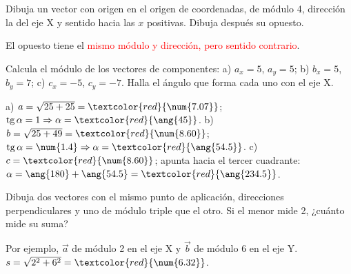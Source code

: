 \begin{exercise}
    Dibuja un vector con origen en el origen de coordenadas, de módulo 4, dirección la del eje X y sentido hacia las \(x\) positivas. Dibuja después su opuesto.
    \begin{solu}
        \begin{center}
        \end{center}
        El opuesto tiene el \textcolor{red}{mismo módulo y dirección, pero sentido contrario}.
    \end{solu}
\end{exercise}

\begin{exercise}
    Calcula el módulo de los vectores de componentes: a) \(a_x = 5\), \(a_y = 5\); b) \(b_x = 5\), \(b_y = 7\); c) \(c_x = -5\), \(c_y = -7\). Halla el ángulo que forma cada uno con el eje X.
    \begin{solu}
        a) \(a = \sqrt{25 + 25} = \textcolor{red}{\num{7.07}}\); \(\tg\alpha = 1 \Rightarrow \alpha = \textcolor{red}{\ang{45}}\).
        b) \(b = \sqrt{25 + 49} = \textcolor{red}{\num{8.60}}\); \(\tg\alpha = \num{1.4} \Rightarrow \alpha = \textcolor{red}{\ang{54.5}}\).
        c) \(c = \textcolor{red}{\num{8.60}}\); apunta hacia el tercer cuadrante: \(\alpha = \ang{180} + \ang{54.5} = \textcolor{red}{\ang{234.5}}\).
    \end{solu}
\end{exercise}

\begin{exercise}
    Dibuja dos vectores con el mismo punto de aplicación, direcciones perpendiculares y uno de módulo triple que el otro. Si el menor mide 2, ¿cuánto mide su suma?
    \begin{solu}
        Por ejemplo, \(\vec{a}\) de módulo 2 en el eje X y \(\vec{b}\) de módulo 6 en el eje Y. \(s = \sqrt{2^2 + 6^2} = \textcolor{red}{\num{6.32}}\).
    \end{solu}
\end{exercise}

